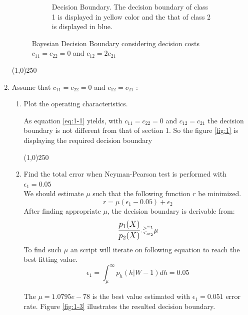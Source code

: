 \documentclass[12pt]{article}
\newcommand{\gl}{^{>^{w_1}}_{<_{w_2}}}
\begin{document}
\begin{enumerate}
\begin{figure}[h]
\begin{subfigure}{0.4\textwidth}
\caption{Decision Boundary. The decision boundary of class 1 is displayed in yellow color and the that of class 2 is displayed in blue.}
\end{subfigure}
\caption{Bayesian Decision Boundary considering decision costs $c_{11} = c_{22} = 0$ and $c_12 = 2c_{21}$}
\label{fig:1-2}
\end{figure}

\begin{center}
\line(1,0){250}
\end{center}

\item Assume that $c_{11} = c_{22} = 0$ and $c_{12} = c_{21}$ :
\begin{enumerate}

\item Plot the operating characteristics.

As equation \eqref{eq:1-1} yields, with $c_{11} = c_{22} = 0$ and $c_{12} = c_{21}$ the decision boundary is not different from that of section 1. So the figure \ref{fig:1} is displaying the required decision boundary

\begin{center}
\line(1,0){250}
\end{center}

\item Find the total error when Neyman-Pearson test is performed with $\epsilon_1 = 0.05$ \\

We should estimate $\mu$ such that the following function $r$ be minimized.
\begin{equation}
r = \mu(\epsilon_1 - 0.05) + \epsilon_2
\end{equation}
After finding appropriate $\mu$, the decision boundary is derivable from:
\begin{equation}
\mathlarger{\frac{p_1(X)}{p_2(X)}} .\gl \mu
\end{equation}
To find such $\mu$ an script will iterate on following equation to reach the best fitting value.
\begin{equation}
\epsilon_1 = \int^{\infty}_\mu p_h(h|W-1) dh = 0.05
\end{equation}

The $\mu = 1.0795e-78$ is the best value estimated with $\epsilon_1 = 0.051$ error rate. Figure \ref{fig:1-3} illustrates the resulted decision boundary.


\end{enumerate}
\end{enumerate}
\end{document}
